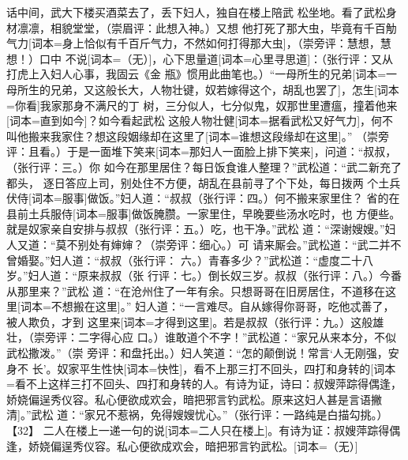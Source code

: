 \documentclass[UTF8,scheme=chinese,11pt,linespread=1.4]{ctexbook}
\makeatletter
\newcommand{\banben}[2][]{#2}
\newenvironment{diben}[1]
  {\list{}{\listparindent 2em
    \itemindent\listparindent
    \rightmargin 0em  %
    \leftmargin 0em  %
    \parsep \z@ \@plus\p@}%
   \item\relax}
  {\endlist}
\makeatother
\begin{document}
\begin{diben}
说话中间，武大下楼买酒菜去了，丢下妇人，独自在楼上陪武
松坐地。看了武松身材凛凛，相貌堂堂，（崇眉评：此想入神。）\banben{又想
他打死了那大虫，毕竟有千百觔气力}[词本={身上恰似有千百斤气力，不然如何打得那大虫}]，（崇旁评：慧想，慧想！）\banben{口中
不说}[词本={（无）}]，\banben{心下思量道}[词本={心里寻思道}]：（张行评：又从打虎上入妇人心事，我固云《金
瓶》惯用此曲笔也。）“\banben{一母所生的兄弟}[词本={一母所生的兄弟，又这般长大，人物壮键，奴若嫁得这个，胡乱也罢了}]，\banben{怎生}[词本={你看}]我家那身不满尺的丁
树，三分似人，七分似鬼，奴那世里遭瘟，\banben{撞着他来}[词本={直到如今}]？\banben{如今看起武松
这般人物壮健}[词本={据看武松又好气力}]，何不叫他搬来我家住？\banben{想这段姻缘却在这里了}[词本={谁想这段缘却在这里}]。”
（崇旁评：且看。）\banben{于是一面堆下笑来}[词本={那妇人一面脸上排下笑来}]，问道：“叔叔，（张行评：三。）你
如今在那里居住？每日饭食谁人整理？”武松道：“武二新充了都头，
逐日答应上司，别处住不方便，胡乱在县前寻了个下处，每日拨两
个土兵\banben{伏侍}[词本={服事}]做饭。”妇人道：“叔叔（张行评：四。）何不搬来家里住？
省的在县前土兵\banben{服侍}[词本={服事}]做饭腌臜。一家里住，早晚要些汤水吃时，也
方便些。就是奴家亲自安排与叔叔（张行评：五。）吃，也干净。”武松
道：“深谢嫂嫂。”妇人又道：“莫不别处有婶婶？（崇旁评：细心。）可
请来厮会。”武松道：“武二并不曾婚娶。”妇人道：“叔叔（张行评：
六。）青春多少？”武松道：“虚度二十八岁。”妇人道：“原来叔叔（张
行评：七。）倒长奴三岁。叔叔（张行评：八。）今番从那里来？”武松
道：“在沧州住了一年有余。只想哥哥在旧房居住，\banben{不道移在这里}[词本={不想搬在这里}]。”
妇人道：“一言难尽。自从嫁得你哥哥，吃他忒善了，被人欺负，\banben{才到
这里来}[词本={才得到这里}]。若是叔叔（张行评：九。）这般雄壮，（崇旁评：二字得心应
口。）谁敢道个不字！”武松道：“家兄从来本分，不似武松撒泼。”（崇
旁评：和盘托出。）妇人笑道：“怎的颠倒说！常言‘人无刚强，安身不
长’。奴家平生\banben{性快}[词本={快性}]，\banben{看不上那三打不回头，四打和身转的}[词本={看不上这样三打不回头、四打和身转的人。有诗为证，诗曰：叔嫂萍踪得偶逢，娇娆偏逞秀仪容。私心便欲成欢会，暗把邪言钓武松。原来这妇人甚是言语撇清}]。”武松
道：“家兄不惹祸，免得嫂嫂忧心。”（张行评：一路纯是白描勾挑。）【32】
\banben{二人在楼上一递一句的说}[词本={二人只在楼上}]。\banben{有诗为证：叔嫂萍踪得偶逢，娇娆偏逞秀仪容。私心便欲成欢会，暗把邪言钓武松。}[词本={（无）}]


\end{diben}
\end{document}
